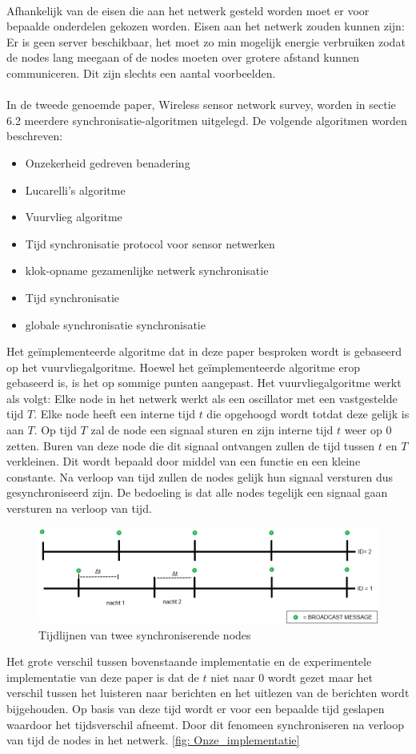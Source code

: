 \documentclass{article}
\begin{document}
\\
Afhankelijk van de eisen die aan het netwerk gesteld worden moet er voor bepaalde onderdelen gekozen worden. Eisen aan het netwerk zouden kunnen zijn: Er is geen server beschikbaar, het moet zo min mogelijk energie verbruiken zodat de nodes lang meegaan of de nodes moeten over grotere afstand kunnen communiceren. Dit zijn slechts een aantal voorbeelden. \\
\\
In de tweede genoemde paper, Wireless sensor network survey, worden in sectie 6.2 meerdere synchronisatie-algoritmen uitgelegd. De volgende algoritmen worden beschreven:
\begin{itemize}
	\item Onzekerheid gedreven benadering
	\item Lucarelli's algoritme
	\item Vuurvlieg algoritme
	\item Tijd synchronisatie protocol voor sensor netwerken
	\item klok-opname gezamenlijke netwerk synchronisatie
	\item Tijd synchronisatie
	\item globale synchronisatie
	synchronisatie 
\end{itemize}
Het ge\"{i}mplementeerde algoritme dat in deze paper besproken wordt is gebaseerd op het vuurvliegalgoritme. Hoewel het ge\"{i}mplementeerde algoritme erop gebaseerd is, is het op sommige punten aangepast. 
Het vuurvliegalgoritme werkt als volgt: 
Elke node in het netwerk werkt als een oscillator met een vastgestelde tijd $T$. Elke node heeft een interne tijd $t$ die opgehoogd wordt totdat deze gelijk is aan $T$. Op tijd $T$ zal de node een signaal sturen en zijn interne tijd $t$ weer op $0$ zetten. Buren van deze node die dit signaal ontvangen zullen de tijd tussen $t$ en $T$ verkleinen. Dit wordt bepaald door middel van een functie en een kleine constante. Na verloop van tijd zullen de nodes gelijk hun signaal versturen dus gesynchroniseerd zijn. De bedoeling is dat alle nodes tegelijk een signaal gaan versturen na verloop van tijd.  
\begin{figure}[h]
\centering\includegraphics[scale=0.5]{sync.png}
\caption{Tijdlijnen van twee synchroniserende nodes}
\label{Onze_implementatie}
\end{figure}
Het grote verschil tussen bovenstaande implementatie en de experimentele implementatie van deze paper is dat de $t$ niet naar $0$ wordt gezet maar het verschil tussen het luisteren naar berichten en het uitlezen van de berichten wordt bijgehouden. Op basis van deze tijd wordt er voor een bepaalde tijd geslapen waardoor het tijdsverschil afneemt. Door dit fenomeen synchroniseren na verloop van tijd de nodes in het netwerk. 
\ref{fig: Onze_implementatie}
\end{document}

